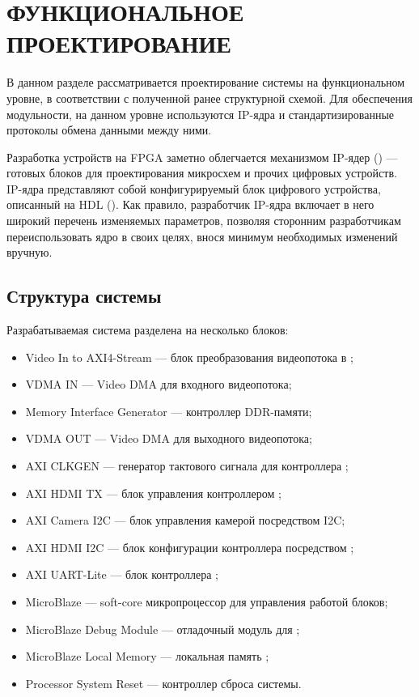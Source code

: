 \section{ФУНКЦИОНАЛЬНОЕ ПРОЕКТИРОВАНИЕ}
\label{sec:functional}

В данном разделе рассматривается проектирование системы на функциональном уровне, в
соответствии с полученной ранее структурной схемой. Для обеспечения модульности,
на данном уровне используются IP-ядра и стандартизированные протоколы обмена данными
между ними.

Разработка устройств на FPGA заметно облегчается механизмом IP-ядер () --- готовых
блоков для проектирования микросхем и прочих цифровых устройств. IP-ядра представляют собой
конфигурируемый блок цифрового устройства, описанный на HDL ().
Как правило, разработчик IP-ядра включает в него широкий перечень изменяемых параметров,
позволяя сторонним разработчикам переиспользовать ядро в своих целях, внося минимум необходимых
изменений вручную.

\subsection{Структура системы}
\label{sec:functional:structure}

Разрабатываемая система разделена на несколько блоков:

\begin{itemize}
  \item Video In to AXI4-Stream --- блок преобразования видеопотока в ;
  \item VDMA IN --- Video DMA для входного видеопотока;
  \item Memory Interface Generator --- контроллер DDR-памяти;
  \item VDMA OUT --- Video DMA для выходного видеопотока;
  \item AXI CLKGEN --- генератор тактового сигнала для контроллера ;
  \item AXI HDMI TX --- блок управления контроллером ;
  \item AXI Camera I2C --- блок управления камерой посредством I2C;
  \item AXI HDMI I2C --- блок конфигурации контроллера  посредством ;
  \item AXI UART-Lite --- блок контроллера ;
  \item MicroBlaze --- soft-core микропроцессор для управления работой блоков;
  \item MicroBlaze Debug Module --- отладочный модуль для ;
  \item MicroBlaze Local Memory --- локальная память ;
  \item Processor System Reset --- контроллер сброса системы.
\end{itemize}

